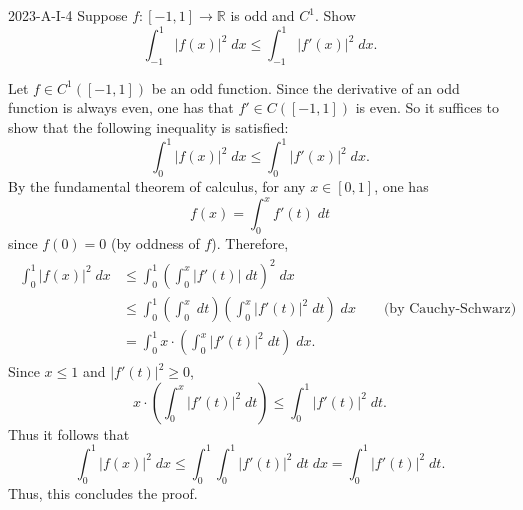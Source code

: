 \documentclass{article}
\begin{document}
	\begin{prb}{2023-A-I-4}
		Suppose $f: [-1,1] \to \mathbb{R}$ is odd and $C^1$. Show 
		\begin{equation*}
			\int_{-1}^{1}|f(x)|^2\;dx \leq \int_{-1}^{1}|f'(x)|^2\;dx. 		
		\end{equation*} 
	\end{prb}
	Let $f \in C^{1}([-1,1])$ be an odd function. Since the derivative of an odd function is always even, one has that $f' \in C([-1,1])$ is even. So it suffices to show that the following inequality is satisfied: 
	\begin{equation*}
		\int_{0}^{1}|f(x)|^2\;dx \leq \int_{0}^{1}|f'(x)|^{2}\;dx. 
	\end{equation*}
	By the fundamental theorem of calculus, for any $x \in [0,1]$, one has 
	\begin{equation*}
		f(x) = \int_{0}^{x}f'(t)\;dt
	\end{equation*}
	since $f(0) = 0$ (by oddness of $f$). Therefore, 
	\begin{align*}
		\begin{split}
			\int_{0}^{1}|f(x)|^2\;dx &\leq \int_{0}^{1}\left(\int_{0}^{x}|f'(t)|\;dt\right)^{2}\;dx \\
			&\leq \int_{0}^{1}\left(\int_{0}^{x}\;dt\right)\left(\int_{0}^{x}|f'(t)|^2\;dt\right)\;dx \qquad \text{(by Cauchy-Schwarz)} \\
			&= \int_{0}^{1}x\cdot \left(\int_{0}^{x}|f'(t)|^2\;dt\right)\;dx.
		\end{split}
	\end{align*}
	Since $x \leq 1$ and $|f'(t)|^2 \geq 0$, 
	\begin{equation*}
		x \cdot \left(\int_{0}^{x}|f'(t)|^2\;dt\right) \leq \int_{0}^{1}|f'(t)|^2\;dt. 
	\end{equation*}
	Thus it follows that 
	\begin{equation*}
		\int_{0}^{1}|f(x)|^2\;dx \leq \int_{0}^{1}\int_{0}^{1}|f'(t)|^2\;dt\;dx = \int_{0}^{1}|f'(t)|^2\;dt. 
	\end{equation*}
	Thus, this concludes the proof. 
	
\end{document}
